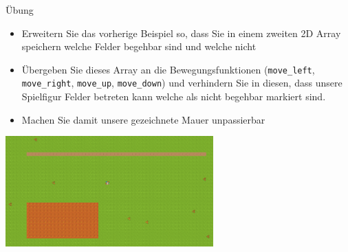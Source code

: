 \documentclass[presentation]{beamer}
\begin{document}
\begin{frame}[label={sec:orge1c6a23},fragile]{Übung}
 \begin{itemize}
\item Erweitern Sie das vorherige Beispiel so, dass Sie in einem zweiten
2D Array speichern welche Felder begehbar sind und welche nicht
\item Übergeben Sie dieses Array an die Bewegungsfunktionen ({\color{solarizedYellow}\texttt{move\_left}},
{\color{solarizedYellow}\texttt{move\_right}}, {\color{solarizedYellow}\texttt{move\_up}}, {\color{solarizedYellow}\texttt{move\_down}}) und verhindern Sie in diesen,
dass unsere Spielfigur Felder betreten kann welche als nicht
begehbar markiert sind.
\item Machen Sie damit unsere gezeichnete Mauer unpassierbar
\end{itemize}
\begin{center}\begin{center}
\includegraphics[width=0.6\textwidth]{data/00/1df613-db63-4675-993c-1159913a0378/screenshot-20200507-214418.png}
\end{center}\end{center}
\end{frame}
\end{document}
